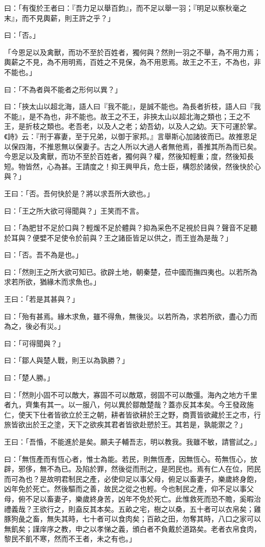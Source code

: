 \begin{pinyinscope}
曰：「有復於王者曰：『吾力足以舉百鈞』，而不足以舉一羽；『明足以察秋毫之末』，而不見輿薪，則王許之乎？」

曰：「否。」

「今恩足以及禽獸，而功不至於百姓者，獨何與？然則一羽之不舉，為不用力焉；輿薪之不見，為不用明焉，百姓之不見保，為不用恩焉。故王之不王，不為也，非不能也。」

曰：「不為者與不能者之形何以異？」

曰：「挾太山以超北海，語人曰『我不能』，是誠不能也。為長者折枝，語人曰『我不能』，是不為也，非不能也。故王之不王，非挾太山以超北海之類也；王之不王，是折枝之類也。老吾老，以及人之老；幼吾幼，以及人之幼。天下可運於掌。《詩》云：『刑于寡妻，至于兄弟，以御于家邦。』言舉斯心加諸彼而已。故推恩足以保四海，不推恩無以保妻子。古之人所以大過人者無他焉，善推其所為而已矣。今恩足以及禽獸，而功不至於百姓者，獨何與？權，然後知輕重；度，然後知長短。物皆然，心為甚。王請度之！抑王興甲兵，危士臣，構怨於諸侯，然後快於心與？」

王曰：「否。吾何快於是？將以求吾所大欲也。」

曰：「王之所大欲可得聞與？」王笑而不言。

曰：「為肥甘不足於口與？輕煖不足於體與？抑為采色不足視於目與？聲音不足聽於耳與？便嬖不足使令於前與？王之諸臣皆足以供之，而王豈為是哉？」

曰：「否。吾不為是也。」

曰：「然則王之所大欲可知已。欲辟土地，朝秦楚，莅中國而撫四夷也。以若所為求若所欲，猶緣木而求魚也。」

王曰：「若是其甚與？」

曰：「殆有甚焉。緣木求魚，雖不得魚，無後災。以若所為，求若所欲，盡心力而為之，後必有災。」

曰：「可得聞與？」

曰：「鄒人與楚人戰，則王以為孰勝？」

曰：「楚人勝。」

曰：「然則小固不可以敵大，寡固不可以敵眾，弱固不可以敵彊。海內之地方千里者九，齊集有其一。以一服八，何以異於鄒敵楚哉？蓋亦反其本矣。今王發政施仁，使天下仕者皆欲立於王之朝，耕者皆欲耕於王之野，商賈皆欲藏於王之市，行旅皆欲出於王之塗，天下之欲疾其君者皆欲赴愬於王。其若是，孰能禦之？」

王曰：「吾惛，不能進於是矣。願夫子輔吾志，明以教我。我雖不敏，請嘗試之。」

曰：「無恆產而有恆心者，惟士為能。若民，則無恆產，因無恆心。苟無恆心，放辟，邪侈，無不為已。及陷於罪，然後從而刑之，是罔民也。焉有仁人在位，罔民而可為也？是故明君制民之產，必使仰足以事父母，俯足以畜妻子，樂歲終身飽，凶年免於死亡。然後驅而之善，故民之從之也輕。今也制民之產，仰不足以事父母，俯不足以畜妻子，樂歲終身苦，凶年不免於死亡。此惟救死而恐不贍，奚暇治禮義哉？王欲行之，則盍反其本矣。五畝之宅，樹之以桑，五十者可以衣帛矣；雞豚狗彘之畜，無失其時，七十者可以食肉矣；百畝之田，勿奪其時，八口之家可以無飢矣；謹庠序之教，申之以孝悌之義，頒白者不負戴於道路矣。老者衣帛食肉，黎民不飢不寒，然而不王者，未之有也。」


\end{pinyinscope}